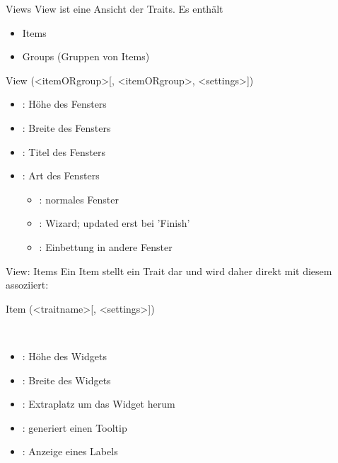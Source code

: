 \documentclass[hyperref={xetex}]{beamer}
\begin{document}
\begin{frame}[fragile]{Views}
  \alert{View} ist eine Ansicht der Traits. Es enthält
  \begin{itemize}
    \item \alert{Items}
    \item \alert{Groups} (Gruppen von Items) 
  \end{itemize}
  \begin{pyin}
View (<itemORgroup>[, <itemORgroup>, <settings>])
  \end{pyin}

  \begin{itemize}
  \item {}: Höhe des Fensters\\
  \item {}: Breite des Fensters\\
  \item {}: Titel des Fensters\\
  \item {}: Art des Fensters
    \begin{itemize}
      \item {} : normales Fenster
      \item {}: Wizard; updated erst bei 'Finish'
      \item {}: Einbettung in andere Fenster
    \end{itemize}
\end{itemize}
\end{frame}

\begin{frame}[fragile]{View: Items}
Ein Item stellt ein Trait dar und wird daher direkt mit diesem assoziiert:
  \begin{pyin}
Item (<traitname>[, <settings>])
  \end{pyin}

  \\
\begin{itemize}
  \item {}: Höhe des Widgets\\
  \item {}: Breite des Widgets\\
  \item {}: Extraplatz um das Widget herum\\
  \item {}: generiert einen Tooltip\\
  \item {}: Anzeige eines Labels
\end{itemize}
\end{frame}
\end{document}
